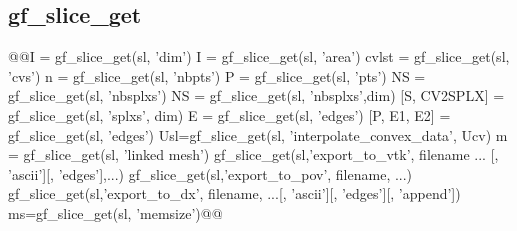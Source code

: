 \subsection{gf\_slice_get}
\begin{synopsis}
@@\tint I = gf_slice_get(sl, 'dim')
\tscal I = gf_slice_get(sl, 'area')
\tivec cvlst = gf_slice_get(sl, 'cvs')
\tint n = gf_slice_get(sl, 'nbpts')
\tmat P = gf_slice_get(sl, 'pts')
\tivec NS = gf_slice_get(sl, 'nbsplxs')
\tint NS = gf_slice_get(sl, 'nbsplxs',\tint dim)
[\timat S, \tivec CV2SPLX] = gf_slice_get(sl, 'splxs', \tint dim)
\tmat E = gf_slice_get(sl, 'edges')
[\tmat P, \tivec E1, \tivec E2] = gf_slice_get(sl, 'edges')
\tvec Usl=gf_slice_get(sl, 'interpolate_convex_data', Ucv)
\tmesh m = gf_slice_get(sl, 'linked mesh')
gf_slice_get(sl,'export_to_vtk', filename ... [, 'ascii'][, 'edges'],...)
gf_slice_get(sl,'export_to_pov', filename, ...)
gf_slice_get(sl,'export_to_dx', filename, ...[, 'ascii'][, 'edges'][, 'append'])
\tint ms=gf_slice_get(sl, 'memsize')@@\end{synopsis}
